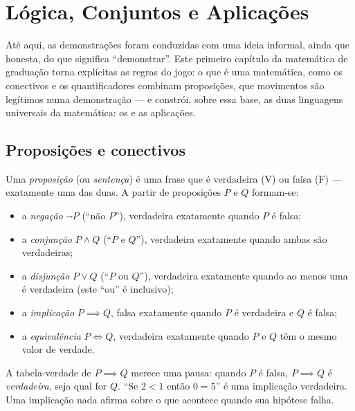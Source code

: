 \chapter{Lógica, Conjuntos e Aplicações}\label{ch:b1:logic}

Até aqui, as demonstrações foram conduzidas com uma ideia informal, ainda
que honesta, do que significa ``demonstrar''. Este primeiro capítulo da
matemática de graduação torna explícitas as regras do jogo: o que é uma
 matemática, como os conectivos e os quantificadores combinam
proposições, que movimentos são legítimos numa demonstração --- e constrói,
sobre essa base, as duas linguagens universais da matemática: os 
e as aplicações.

\section{Proposições e conectivos}

\begin{definition}\label{def:b1:logic:statement}
Uma \emph{proposição} (ou \emph{sentença}) é uma frase
que é verdadeira (V) ou falsa (F) --- exatamente uma das duas. A partir
de proposições $P$ e $Q$ formam-se:
\begin{itemize}
  \item a \emph{negação} $\lnot P$ (``não $P$''), verdadeira exatamente
        quando $P$ é falsa;
  \item a \emph{conjunção} $P \land Q$ (``$P$ e $Q$''), verdadeira
        exatamente quando ambas são verdadeiras;
  \item a \emph{disjunção} $P \lor Q$ (``$P$ ou $Q$''), verdadeira
        exatamente quando ao menos uma é verdadeira (este ``ou'' é inclusivo);
  \item a \emph{implicação} $P \implies Q$, falsa exatamente quando $P$
        é verdadeira e $Q$ é falsa;
  \item a \emph{equivalência} $P \iff Q$, verdadeira exatamente quando $P$ e
        $Q$ têm o mesmo valor de verdade.
\end{itemize}
\end{definition}

\begin{remark}
A tabela-verdade de $P \implies Q$ merece uma pausa: quando $P$ é falsa,
$P \implies Q$ é \emph{verdadeira}, seja qual for $Q$. ``Se $2 < 1$ então
$0 = 5$'' é uma implicação verdadeira. Uma implicação nada afirma sobre
o que acontece quando sua hipótese falha.
\end{remark}

